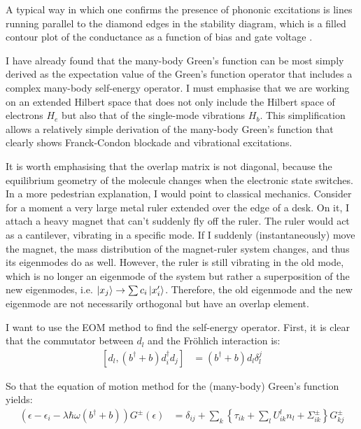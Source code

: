 A typical way in which one confirms the presence of phononic excitations is lines running parallel to the diamond edges in the stability diagram, which is a filled contour plot of the conductance as a function of bias and gate voltage \cite{vibrationcomputation}.

I have already found that the many-body Green's function can be most simply derived as the expectation value of the Green's function operator that includes a complex many-body self-energy operator. I must emphasise that we are working on an extended Hilbert space that does not only include the Hilbert space of electrons $H_e$ but also that of the single-mode vibrations $H_b$. This simplification allows a relatively simple derivation of the many-body Green's function that clearly shows Franck-Condon blockade and vibrational excitations.  

It is worth emphasising that the overlap matrix is not diagonal, because the equilibrium geometry of the molecule changes when the electronic state switches. In a more pedestrian explanation, I would point to classical mechanics. Consider for a moment a very large metal ruler extended over the edge of a desk. On it, I attach a heavy magnet that can't suddenly fly off the ruler. The ruler would act as a cantilever, vibrating in a specific mode. If I suddenly (instantaneously) move the magnet, the mass distribution of  the magnet-ruler system changes, and thus its eigenmodes do as well. However, the ruler is still vibrating in the old mode, which is no longer an eigenmode of the system but rather a superposition of the new eigenmodes, i.e. $\ket{x_j} \rightarrow \sum c_i \ket{x'_i}$. Therefore, the old eigenmode and the new eigenmode are not necessarily orthogonal but have an overlap element. 

I want to use the EOM method to find the self-energy operator. First, it is clear that the commutator between $d_l$ and the Fr\"ohlich interaction is:
\begin{align*}
 \left[ d_l, (b^\dagger + b) d_i^\dagger d_j \right] &= (b^\dagger + b) d_l \delta^j_l
\end{align*}

So that the equation of motion method for the (many-body) Green's function yields:
\begin{align*}
\left(\epsilon-\epsilon_i - \lambda \hbar \omega \left(b^\dagger + b\right) \right) G^\pm (\epsilon) &= \delta_{ij} + \sum_k \left\{ \tau_{ik} + \sum_l U^l_{ik} n_l + \Sigma^\pm_{ik} \right\} G^\pm_{kj}
\end{align*}

